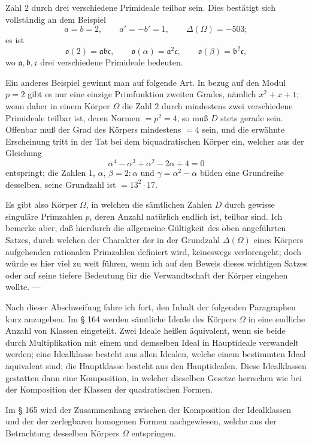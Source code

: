 \documentclass[11pt]{article}
\newcommand{\origpage}[1]{\par\vspace{0.25em}\noindent{\footnotesize\itshape [Gedruckte Seite #1]}\par\vspace{0.25em}}
\newcommand{\ideal}[1]{\mathfrak{#1}}
\begin{document}
\origpage{406}
Zahl $2$ durch drei verschiedene Primideale teilbar sein. Dies bestätigt sich vollständig an dem Beispiel
\[
a=b=2,\qquad a'=-b'=1,\qquad \Delta(\Omega)=-503;
\]
es ist
\[
\ideal{o}(2)=\ideal{a}\ideal{b}\ideal{c},\qquad \ideal{o}(\alpha)=\ideal{a}^2\ideal{c},\qquad \ideal{o}(\beta)=\ideal{b}^2\ideal{c},
\]
wo $\ideal{a},\ideal{b},\ideal{c}$ drei verschiedene Primideale bedeuten.

Ein anderes Beispiel gewinnt man auf folgende Art. In bezug auf den Modul $p=2$ gibt es nur eine einzige Primfunktion zweiten Grades, nämlich $x^2+x+1$; wenn daher in einem Körper $\Omega$ die Zahl $2$ durch mindestens zwei verschiedene Primideale teilbar ist, deren Normen $=p^2=4$, so muß $D$ stets gerade sein. Offenbar muß der Grad des Körpers mindestens $=4$ sein, und die erwähnte Erscheinung tritt in der Tat bei dem biquadratischen Körper ein, welcher aus der Gleichung
\[
\alpha^4-\alpha^3+\alpha^2-2\alpha+4=0
\]
entspringt; die Zahlen $1$, $\alpha$, $\beta=2:\alpha$ und $\gamma=\alpha^2-\alpha$ bilden eine Grundreihe desselben, seine Grundzahl ist $=13^2\cdot 17$.

Es gibt also Körper $\Omega$, in welchen die sämtlichen Zahlen $D$ durch gewisse singuläre Primzahlen $p$, deren Anzahl natürlich endlich ist, teilbar sind. Ich bemerke aber, daß hierdurch die allgemeine Gültigkeit des oben angeführten Satzes, durch welchen der Charakter der in der Grundzahl $\Delta(\Omega)$ eines Körpers aufgehenden rationalen Primzahlen definiert wird, keineswegs verlorengeht; doch würde es hier viel zu weit führen, wenn ich auf den Beweis dieses wichtigen Satzes oder auf seine tiefere Bedeutung für die Verwandtschaft der Körper eingehen wollte. ---

Nach dieser Abschweifung fahre ich fort, den Inhalt der folgenden Paragraphen kurz anzugeben. Im § 164 werden sämtliche Ideale des Körpers $\Omega$ in eine endliche Anzahl von Klassen eingeteilt. Zwei Ideale heißen äquivalent, wenn sie beide durch Multiplikation mit einem und demselben Ideal in Hauptideale verwandelt werden; eine Idealklasse besteht aus allen Idealen, welche einem bestimmten Ideal äquivalent sind; die Hauptklasse besteht aus den Hauptidealen. Diese Idealklassen gestatten dann eine Komposition, in welcher dieselben Gesetze herrschen wie bei der Komposition der Klassen der quadratischen Formen.

\origpage{407}
Im § 165 wird der Zusammenhang zwischen der Komposition der Idealklassen und der der zerlegbaren homogenen Formen nachgewiesen, welche aus der Betrachtung desselben Körpers $\Omega$ entspringen.
\end{document}
